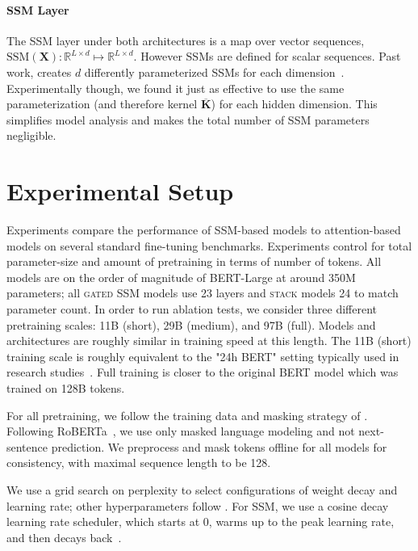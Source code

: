 \paragraph{SSM Layer}

The SSM layer under both architectures is a map over vector sequences, $\text{SSM}(\mathbf{X}):\mathbb{R}^{L\times d} \mapsto \mathbb{R}^{L\times d}$. However SSMs are defined for scalar sequences. Past work, creates $d$ differently parameterized SSMs for each dimension~\cite{gu2021efficiently}. Experimentally though, we found it just as effective to use the same parameterization (and therefore kernel $\mathbf{\overline{K}}$) for each hidden dimension. This simplifies model analysis and makes the total number of SSM parameters negligible.

\section{Experimental Setup}\label{sec:experiments}

Experiments compare the performance of SSM-based models to attention-based models on several standard fine-tuning benchmarks. Experiments control for total parameter-size and amount of pretraining in terms of number of tokens. All models are on the order of magnitude of BERT-Large at around 350M parameters; all \textsc{gated} SSM models use 23 layers and \textsc{stack} models 24 to match parameter count. In order to run ablation tests, we consider three different pretraining scales: 11B (short), 29B (medium), and 97B (full). Models and architectures are roughly similar in training speed at this length. The 11B (short) training scale is roughly equivalent to the "24h BERT" setting typically used in research studies~\cite{izsak2021train}. Full training is closer to the original BERT model which was trained on 128B tokens. 

For all pretraining, we follow the training data and masking strategy of \citet{izsak2021train}. Following RoBERTa~\cite{liu2019roberta}, we use only masked language modeling and not next-sentence prediction. We preprocess and mask tokens offline for all models for consistency, with maximal sequence length to be 128. 

We use a grid search on perplexity to select configurations of weight decay and learning rate; other hyperparameters follow \citet{izsak2021train}.  For SSM, we use a cosine decay learning rate scheduler, which starts at 0, warms up to the peak learning rate, and then decays back~\cite{gu2021efficiently}. 

